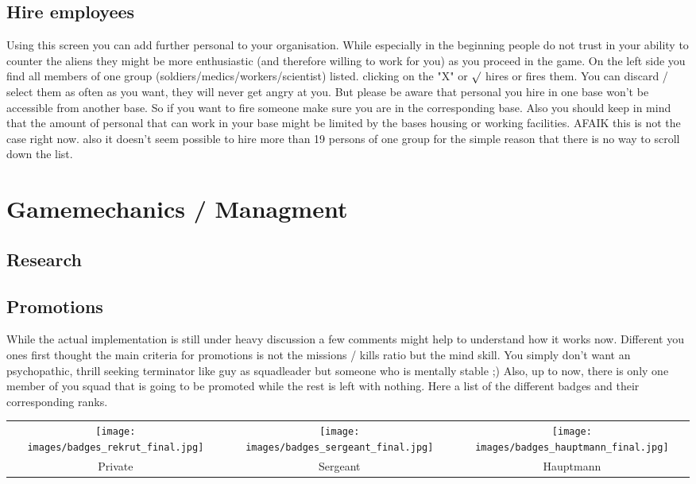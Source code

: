 \subsection{Hire employees}
Using this screen you can add further personal to your organisation. While especially in the beginning people do not trust in your ability to counter the aliens they might be more enthusiastic (and therefore willing to work for you) as you proceed in the game. On the left side you find all members of one group (soldiers/medics/workers/scientist) listed. clicking on the "X" or $\surd$ hires or fires them. You can discard / select them as often as you want, they will never get angry at you. But please be aware that personal you hire in one base won't be accessible from another base. So if you want to fire someone make sure you are in the corresponding base. Also you should keep in mind that the amount of personal that can work in your base might be limited by the bases housing or working facilities. AFAIK this is not the case right now. also it doesn't seem possible to hire more than 19 persons of one group for the simple reason that there is no way to scroll down the list.

\section{Gamemechanics / Managment}
\subsection{Research}
\subsection{Promotions}
While the actual implementation is still under heavy discussion a few comments might help to understand how it works now. Different you ones first thought the main criteria for promotions is not the missions / kills ratio but the mind skill. You simply don't want an psychopathic, thrill seeking terminator like guy as squadleader but someone who is mentally stable ;) Also, up to now, there is only one member of you squad that is going to be promoted while the rest is left with nothing.
Here a list of the different badges and their corresponding ranks.

\begin{tabular}{ccc}
\texttt{[image: images/badges\_rekrut\_final.jpg]} & \texttt{[image: images/badges\_sergeant\_final.jpg]} & \texttt{[image: images/badges\_hauptmann\_final.jpg]}\\
Private & Sergeant & Hauptmann\\
\end{tabular} 
